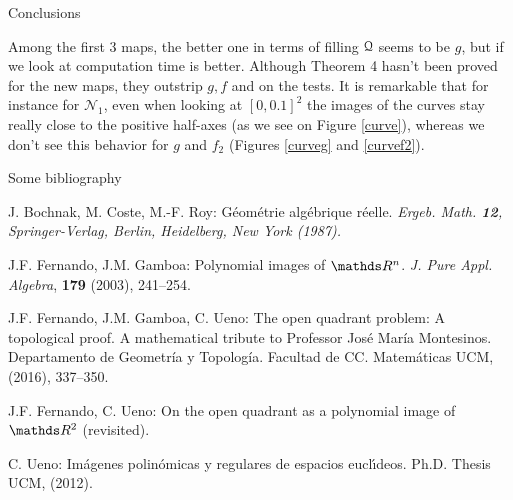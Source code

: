 \documentclass[final]{beamer}
\newlength{\onecolwid}
\begin{document}
\begin{frame}[t]
\begin{columns}[t]
\begin{column}{\onecolwid}
 
\begin{block}{Conclusions}

Among the first 3 maps, the better one in terms of filling $\mathcal{Q}$ seems to be $g$, but if we look at computation time \scalebox{1.5}{$\FFF$} is better.
Although Theorem 4 hasn't been proved for the new maps, they outstrip $g, f$ and \scalebox{1.5}{$\FFF$} on the tests. It is remarkable that for instance for $\mathcal{N}_1$, even when looking at $[0,0.1]^2$ the images of the curves stay really close to the positive half-axes (as we see on Figure \ref{curve}), whereas we don't see this behavior for $g$ and $f_2$ (Figures \ref{curveg} and \ref{curvef2}).
 
\end{block}

 
\begin{block}{Some bibliography}
 
\footnotesize{
\begin{thebibliography}{ABR}

 J. Bochnak, M. Coste, M.-F. Roy: G\'eom\'etrie alg\'ebrique r\'eelle. \em Ergeb. Math. \em \textbf{12}, Springer-Verlag, Berlin, Heidelberg, New York (1987).
\vspace{0.2cm}

 J.F. Fernando, J.M. Gamboa: Polynomial images of $\R^n$. {\em J. Pure Appl. Algebra}, \textbf{179} (2003), 241--254.
\vspace{0.2cm}

 J.F. Fernando, J.M. Gamboa, C. Ueno: The open quadrant problem:
A topological proof.  A mathematical tribute to Professor Jos\'e Mar\'ia Montesinos. Departamento de Geometr\'ia y Topolog\'ia. Facultad de CC. Matem\'aticas UCM, (2016), 337--350.
\vspace{0.2cm}

 J.F. Fernando, C. Ueno: On the open quadrant as a polynomial image of $\R^2$ (revisited).
\vspace{0.2cm}

 C. Ueno: Im\'agenes polin\'omicas y regulares de espacios eucl\'\i deos. Ph.D. Thesis UCM, (2012).


\end{thebibliography}}
\end{block}
\end{column}
\end{columns}
\end{frame}
\end{document}
